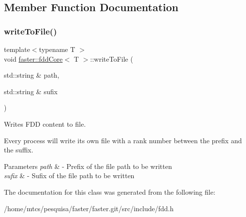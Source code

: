 \subsection{Member Function Documentation}
\hypertarget{classfaster_1_1fddCore_a9504c32481c67c2ceaf98d132ef37ee6}{}\label{classfaster_1_1fddCore_a9504c32481c67c2ceaf98d132ef37ee6} 
\subsubsection{\texorpdfstring{write\+To\+File()}{writeToFile()}}
{\footnotesize\ttfamily template$<$typename T $>$ \\
void \hyperlink{classfaster_1_1fddCore}{faster\+::fdd\+Core}$<$ T $>$\+::write\+To\+File (\begin{DoxyParamCaption}\item[{std\+::string \&}]{path,  }\item[{std\+::string \&}]{sufix }\end{DoxyParamCaption})}



Writes F\+DD content to file. 

Every process will write its own file with a rank number between the prefix and the suffix.


\begin{DoxyParams}{Parameters}
{\em path} & -\/ Prefix of the file path to be written \\
\hline
{\em sufix} & -\/ Sufix of the file path to be written \\
\hline
\end{DoxyParams}


The documentation for this class was generated from the following file\+:\begin{DoxyCompactItemize}
\item 
/home/mtcs/pesquisa/faster/faster.\+git/src/include/fdd.\+h\end{DoxyCompactItemize}

